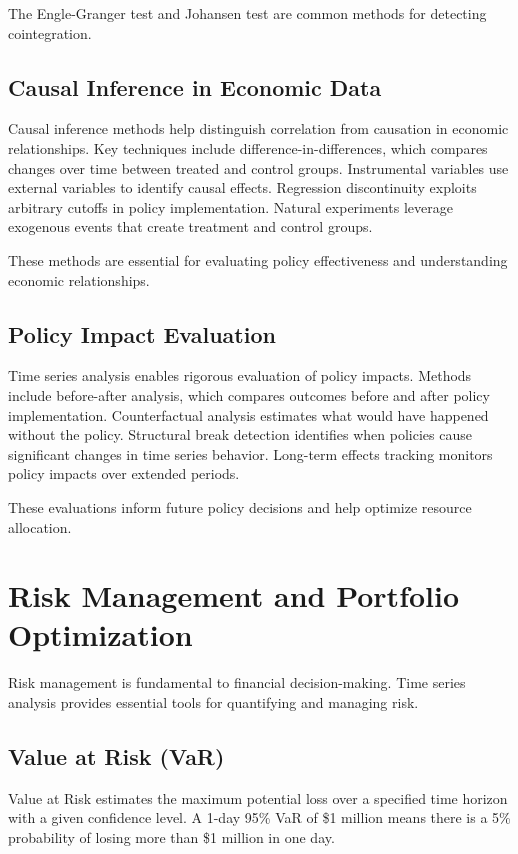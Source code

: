 The Engle-Granger test and Johansen test are common methods for detecting cointegration.

\subsection{Causal Inference in Economic Data}

Causal inference methods help distinguish correlation from causation in economic relationships. Key techniques include difference-in-differences, which compares changes over time between treated and control groups. Instrumental variables use external variables to identify causal effects. Regression discontinuity exploits arbitrary cutoffs in policy implementation. Natural experiments leverage exogenous events that create treatment and control groups.

These methods are essential for evaluating policy effectiveness and understanding economic relationships.

\subsection{Policy Impact Evaluation}

Time series analysis enables rigorous evaluation of policy impacts. Methods include before-after analysis, which compares outcomes before and after policy implementation. Counterfactual analysis estimates what would have happened without the policy. Structural break detection identifies when policies cause significant changes in time series behavior. Long-term effects tracking monitors policy impacts over extended periods.

These evaluations inform future policy decisions and help optimize resource allocation.

\section{Risk Management and Portfolio Optimization}

Risk management is fundamental to financial decision-making. Time series analysis provides essential tools for quantifying and managing risk.

\subsection{Value at Risk (VaR)}

Value at Risk estimates the maximum potential loss over a specified time horizon with a given confidence level. A 1-day 95\% VaR of \$1 million means there is a 5\% probability of losing more than \$1 million in one day.

